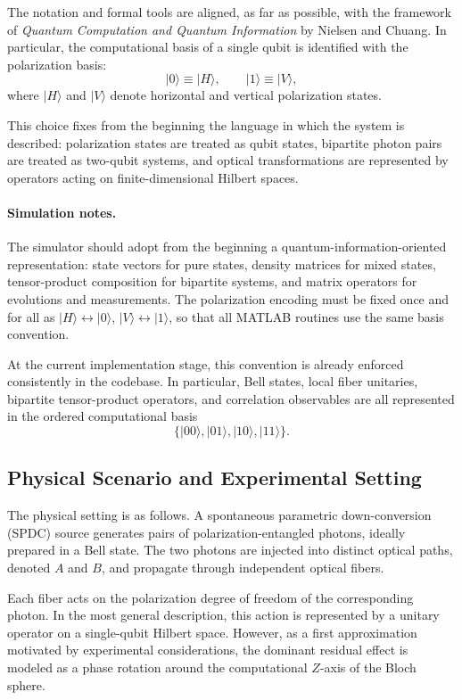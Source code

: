 \documentclass[a4paper]{article}
\begin{document}
The notation and formal tools are aligned, as far as possible, with the framework of \textit{Quantum Computation and Quantum Information} by Nielsen and Chuang. In particular, the computational basis of a single qubit is identified with the polarization basis:
\[
|0\rangle \equiv |H\rangle,
\qquad
|1\rangle \equiv |V\rangle,
\]
where \( |H\rangle \) and \( |V\rangle \) denote horizontal and vertical polarization states.

This choice fixes from the beginning the language in which the system is described: polarization states are treated as qubit states, bipartite photon pairs are treated as two-qubit systems, and optical transformations are represented by operators acting on finite-dimensional Hilbert spaces.

\paragraph{Simulation notes.}
The simulator should adopt from the beginning a quantum-information-oriented representation: state vectors for pure states, density matrices for mixed states, tensor-product composition for bipartite systems, and matrix operators for evolutions and measurements. The polarization encoding must be fixed once and for all as \( |H\rangle \leftrightarrow |0\rangle \), \( |V\rangle \leftrightarrow |1\rangle \), so that all MATLAB routines use the same basis convention.

At the current implementation stage, this convention is already enforced consistently in the codebase. In particular, Bell states, local fiber unitaries, bipartite tensor-product operators, and correlation observables are all represented in the ordered computational basis
\[
\{|00\rangle,|01\rangle,|10\rangle,|11\rangle\}.
\]

\subsection{Physical Scenario and Experimental Setting}

The physical setting is as follows. A spontaneous parametric down-conversion (SPDC) source generates pairs of polarization-entangled photons, ideally prepared in a Bell state. The two photons are injected into distinct optical paths, denoted \(A\) and \(B\), and propagate through independent optical fibers.

Each fiber acts on the polarization degree of freedom of the corresponding photon. In the most general description, this action is represented by a unitary operator on a single-qubit Hilbert space. However, as a first approximation motivated by experimental considerations, the dominant residual effect is modeled as a phase rotation around the computational \(Z\)-axis of the Bloch sphere.
\end{document}

